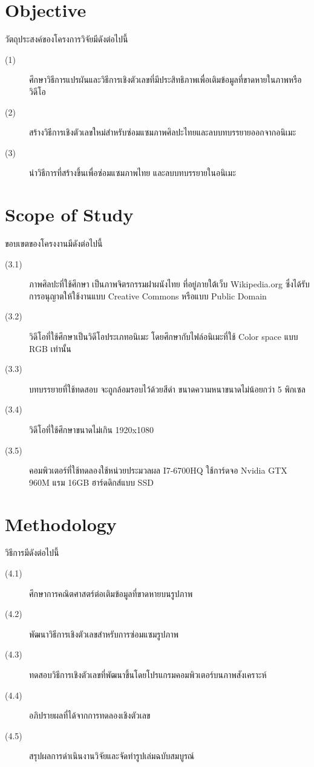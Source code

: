 \documentclass[hidelinks,a4paper,14pt]{article}
\numberwithin{equation}{section}							%
\begin{document}
{		%
		
\section{Objective}
วัตถุประสงค์ของโครงการวิจัยมีดังต่อไปนี้
\begin{description}
	\item[(1)]	 ศึกษาวิธีการแปรผันและวิธีการเชิงตัวเลขที่มีประสิทธิภาพเพื่อเติมข้อมูลที่ขาดหายในภาพหรือวิดีโอ
	\item[(2)] สร้างวิธีการเชิงตัวเลขใหม่สำหรับซ่อมแซมภาพศิลปะไทยและลบบทบรรยายออกจากอนิเมะ
	\item[(3)] นำวิธีการที่สร้างขึ้นเพื่อซ่อมแซมภาพไทย และลบบทบรรยายในอนิเมะ
\end{description}


\section{Scope of Study}
ขอบเขตของโครงงานมีดังต่อไปนี้
\begin{description}
\item[(3.1)] ภาพศิลปะที่ใช้ศึกษา เป็นภาพจิตรกรรมฝาผนังไทย ที่อยู่ภายใต้เว็บ Wikipedia.org ซึ่งได้รับการอนุญาตให้ใช้งานแบบ Creative Commons หรือแบบ Public Domain
\item[(3.2)] วิดีโอที่ใช้ศึกษาเป็นวิดีโอประเภทอนิเมะ โดยศึกษากับไฟล์อนิเมะที่ใช้ Color space แบบ RGB เท่านั้น
\item[(3.3)] บทบรรยายที่ใช้ทดสอบ จะถูกล้อมรอบไว้ด้วยสีดำ ขนาดความหนาขนาดไม่น้อยกว่า 5 พิกเซล
\item[(3.4)] วิดีโอที่ใช้ศึกษาขนาดไม่เกิน 1920x1080
\item[(3.5)] คอมพิวเตอร์ที่ใช้ทดลองใช้หน่วยประมวลผล I7-6700HQ ใช้การ์ดจอ Nvidia GTX 960M แรม 16GB ฮาร์ดดิกส์แบบ SSD
\end{description}

\section{Methodology}
วิธีการมีดังต่อไปนี้
\begin{description}
	\item[(4.1)] ศึกษาการคณิตศาสตร์ต่อเติมข้อมูลที่ขาดหายบนรูปภาพ
	\item[(4.2)] พัฒนาวิธีการเชิงตัวเลขสำหรับการซ่อมแซมรูปภาพ
	\item[(4.3)] ทดสอบวิธีการเชิงตัวเลขที่พัฒนาขึ้นโดยโปรแกรมคอมพิวเตอร์บนภาพสังเคราะห์
	\item[(4.4)] อภิปรายผลที่ได้จากการทดลองเชิงตัวเลข
	\item[(4.5)] สรุปผลการดำเนินงานวิจัยและจัดทำรูปเล่มฉบับสมบูรณ์
\end{description}
}
\end{document}
